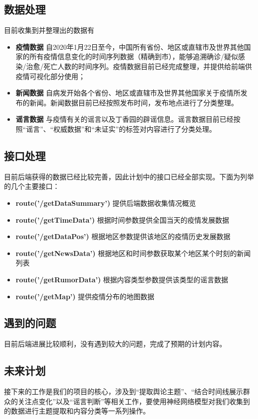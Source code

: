 \documentclass{article}
\begin{document}
\subsection{数据处理}
目前收集到并整理出的数据有
\begin{itemize}
	\item{\textbf{疫情数据}} 自2020年1月22日至今，中国所有省份、地区或直辖市及世界其他国家的所有疫情信息变化的时间序列数据（精确到市），能够追溯确诊/疑似感染/治愈/死亡人数的时间序列。疫情数据目前已经完成整理，并提供给前端供疫情可视化部分使用；
	\item{\textbf{新闻数据}} 自病发开始各个省份、地区或直辖市及世界其他国家关于疫情所发布的新闻。新闻数据目前已经按照发布时间，发布地点进行了分类整理。
	\item{\textbf{谣言数据}} 与疫情有关的谣言以及丁香园的辟谣信息。谣言数据目前已经按照“谣言”、“权威数据”和“未证实”的标签对内容进行了分类处理。
\end{itemize}

\subsection{接口处理}

目前后端获得的数据已经比较完善，因此计划中的接口已经全部实现。下面为列举的几个主要接口：
\begin{itemize}
	\item{\textbf{route('/getDataSummary')}} 提供后端数据收集情况概览 
	\item{\textbf{route('/getTimeData')}} 根据时间参数提供全国当天的疫情发展数据
	\item{\textbf{route('/getDataPos')}} 根据地区参数提供该地区的疫情历史发展数据
	\item{\textbf{route('/getNewsData')}} 根据地区和时间参数获取某个地区某个时刻的新闻列表
	\item{\textbf{route('/getRumorData')}} 根据内容类型参数提供该类型的谣言数据
	\item{\textbf{route('/getMap')}} 提供疫情分布的地图数据
\end{itemize}

\subsection{遇到的问题}
目前后端进展比较顺利，没有遇到较大的问题，完成了预期的计划内容。

\subsection{未来计划}
接下来的工作是我们的项目的核心，涉及到“提取舆论主题”、“结合时间线展示群众的关注点变化”以及“谣言判断”等相关工作，要使用神经网络模型对我们收集到的数据进行主题提取和内容分类等一系列操作。
\end{document}
